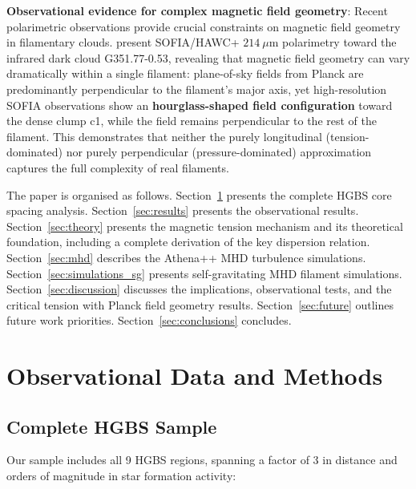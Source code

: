 \documentclass[11pt,a4paper]{article}
\begin{document}
\textbf{Observational evidence for complex magnetic field geometry}: Recent polarimetric observations provide crucial constraints on magnetic field geometry in filamentary clouds. \citet{Jadhav2026} present SOFIA/HAWC+ $214~\mu$m polarimetry toward the infrared dark cloud G351.77-0.53, revealing that magnetic field geometry can vary dramatically within a single filament: plane-of-sky fields from Planck are predominantly perpendicular to the filament's major axis, yet high-resolution SOFIA observations show an \textbf{hourglass-shaped field configuration} toward the dense clump c1, while the field remains perpendicular to the rest of the filament. This demonstrates that neither the purely longitudinal (tension-dominated) nor purely perpendicular (pressure-dominated) approximation captures the full complexity of real filaments.

The paper is organised as follows. Section~\ref{sec:observations} presents the complete HGBS core spacing analysis. Section~\ref{sec:results} presents the observational results. Section~\ref{sec:theory} presents the magnetic tension mechanism and its theoretical foundation, including a complete derivation of the key dispersion relation. Section~\ref{sec:mhd} describes the Athena++ MHD turbulence simulations. Section~\ref{sec:simulations_sg} presents self-gravitating MHD filament simulations. Section~\ref{sec:discussion} discusses the implications, observational tests, and the critical tension with Planck field geometry results. Section~\ref{sec:future} outlines future work priorities. Section~\ref{sec:conclusions} concludes.

\section{Observational Data and Methods}
\label{sec:observations}

\subsection{Complete HGBS Sample}

Our sample includes all 9 HGBS regions, spanning a factor of 3 in distance and orders of magnitude in star formation activity:
\end{document}
